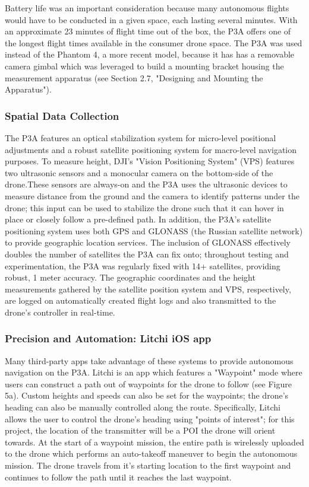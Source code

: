\documentclass[pageno]{jpaper}
\begin{document}
Battery life was an important consideration because many autonomous flights would have to be conducted in a given space, each lasting several minutes. With an approximate 23 minutes of flight time out of the box, the P3A offers one of the longest flight times available in the consumer drone space. The P3A was used instead of the Phantom 4, a more recent model, because it has has a removable camera gimbal which was leveraged to build a mounting bracket housing the measurement apparatus (see Section 2.7, "Designing and Mounting the Apparatus"). 

\subsubsection{Spatial Data Collection}
The P3A features an optical stabilization system for micro-level positional adjustments and a robust satellite positioning system for macro-level navigation purposes. To measure height, DJI's "Vision Positioning System" (VPS) features two ultrasonic sensors and a monocular camera on the bottom-side of the drone.These sensors are always-on and the P3A uses the ultrasonic devices to measure distance from the ground and the camera to identify patterns under the drone; this input can be used to stabilize the drone such that it can hover in place or closely follow a pre-defined path. In addition, the P3A's satellite positioning system uses both GPS and GLONASS (the Russian satellite network) to provide geographic location services. The inclusion of GLONASS effectively doubles the number of satellites the P3A can fix onto; throughout testing and experimentation, the P3A was regularly fixed with 14+ satellites, providing robust, 1 meter accuracy. The geographic coordinates and the height measurements gathered by the satellite position system and VPS, respectively, are logged on automatically created flight logs and also transmitted to the drone's controller in real-time.

\subsubsection{Precision and Automation: Litchi iOS app}
Many third-party apps take advantage of these systems to provide autonomous navigation on the P3A. Litchi is an app which features a "Waypoint" mode where users can construct a path out of waypoints for the drone to follow (see Figure 5a). Custom heights and speeds can also be set for the waypoints; the drone's heading can also be manually controlled along the route. Specifically, Litchi allows the user to control the drone's heading using "points of interest"; for this project, the location of the transmitter will be a POI the drone will orient towards. At the start of a waypoint mission, the entire path is wirelessly uploaded to the drone which performs an auto-takeoff maneuver to begin the autonomous mission. The drone travels from it's starting location to the first waypoint and continues to follow the path until it reaches the last waypoint. 
\end{document}
